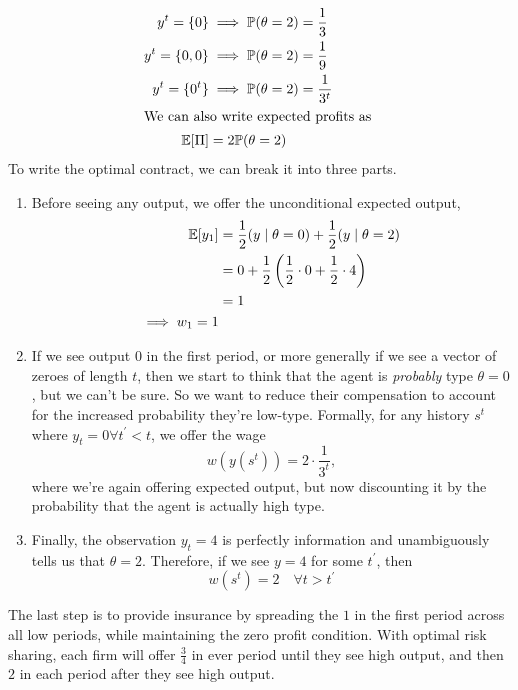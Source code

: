 \begin{enumerate}[label=\alph*)]
\begin{align*}
    y^t = \{0\} &\implies \mathbb{P}(\theta = 2) = \frac{1}{3}\\
    y^t = \{0, 0\} &\implies \mathbb{P}(\theta = 2) = \frac{1}{9}\\
    y^t = \{0^t\} &\implies \mathbb{P}(\theta = 2) = \frac{1}{3^t}\\
    \intertext{We can also write expected profits as }
    \mathbb{E}[\Pi] &= 2 \mathbb{P} (\theta = 2)
  \end{align*}
  To write the optimal contract, we can break it into three parts.
\begin{enumerate}
  \item
  Before seeing any output, we offer the unconditional expected output,
  \begin{align*}
    \mathbb{E}[y_1] &= \frac{1}{2}(y \mid \theta = 0) + \frac{1}{2} (y \mid \theta = 2)\\
            &= 0 + \frac{1}{2} \left(\frac{1}{2} \cdot 0 + \frac{1}{2} \cdot 4\right)\\
            &= 1\\
    \implies w_1 = 1
  \end{align*}
\item If we see output $0$ in the first period, or more generally if we see a vector of zeroes of length $t$, then we start to think that the agent is \emph{probably} type $\theta = 0$, but we can't be sure. So we want to reduce their compensation to account for the increased probability they're low-type. Formally, for any history $s^t$ where $y_t = 0 \forall  t^\prime < t$, we offer the wage
  \[
w(y(s^t)) = 2 \cdot \frac{1}{3^t},
\]
where we're again offering expected output, but now discounting it by the probability that the agent is actually high type.
\item Finally, the observation $y_t = 4$ is perfectly information and unambiguously tells us that $\theta =2$. Therefore, if we see $y = 4$ for some $t^\prime$, then
  \[
w(s^t) = 2 \quad \forall t > t^\prime
  \]
  \end{enumerate}
  The last step is to provide insurance by spreading the $1$ in the first period across all low periods, while maintaining the zero profit condition. With optimal risk sharing, each firm will offer $\frac{3}{4}$ in ever period until they see high output, and then $2$ in each period after they see high output.
\end{enumerate}
